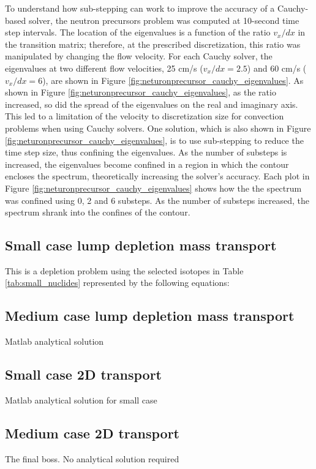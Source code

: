 To understand how sub-stepping can work to improve the accuracy of a Cauchy-based solver, the neutron precursors problem was computed at 10-second time step intervals. The location of the eigenvalues is a function of the ratio $v_{x}/dx$ in the transition matrix; therefore, at the prescribed discretization, this ratio was manipulated by changing the flow velocity. For each Cauchy solver, the eigenvalues at two different flow velocities, 25 cm/s ($v_{x}/dx = 2.5$) and 60 cm/s ($v_{x}/dx = 6$), are shown in Figure \ref{fig:neturonprecursor_cauchy_eigenvalues}. As shown in Figure \ref{fig:neturonprecursor_cauchy_eigenvalues}, as the ratio increased, so did the spread of the eigenvalues on the real and imaginary axis. This led to a limitation of the velocity to discretization size for convection problems when using Cauchy solvers. One solution, which is also shown in Figure \ref{fig:neturonprecursor_cauchy_eigenvalues}, is to use sub-stepping to reduce the time step size, thus confining the eigenvalues. As the number of substeps is increased, the eigenvalues become confined in a region in which the contour encloses the spectrum, theoretically increasing the solver's accuracy. Each plot in Figure \ref{fig:neturonprecursor_cauchy_eigenvalues} shows how the the spectrum was confined using 0, 2 and 6 substeps. As the number of substeps increased, the spectrum shrank into the confines of the contour. 

\subsection{Small case lump depletion mass transport}
This is a depletion problem using the selected isotopes in Table \ref{tab:small_nuclides} represented by the following equations:


\subsection{Medium case lump depletion mass transport}
Matlab analytical solution

\subsection{Small case 2D transport}
Matlab analytical solution for small case 

\subsection{Medium case 2D transport}
The final boss. No analytical solution required
